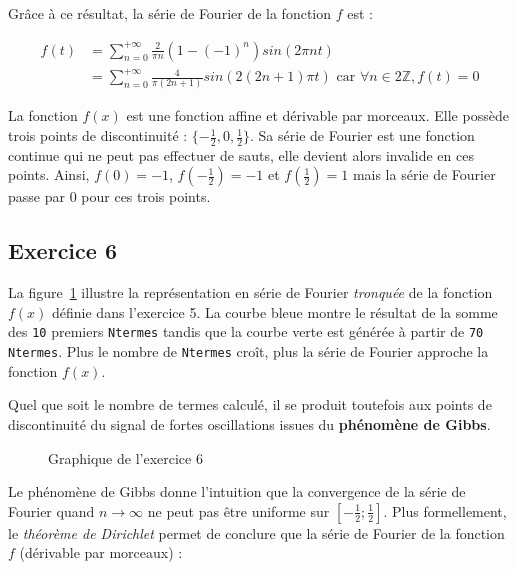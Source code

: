 \documentclass[a4paper,11pt]{article}
\theoremstyle{nonumberplain}
\theoremstyle{nonumberplain}
\theoremstyle{nonumberplain}
\begin{document}
    Grâce à ce résultat, la série de Fourier de la fonction $f$ est :

    \begin{equation*}
        \begin{split}
            f(t)    & = \sum\limits_{n = 0}^{+ \infty}\frac{2}{\pi n}(1 - (-1)^n)sin(2 \pi n t) \\
                    & = \sum\limits_{n = 0}^{+ \infty}\frac{4}{\pi (2n+1)}sin(2 (2n+1) \pi t) \text{ car } \forall n \in 2 \mathbb{Z}, f(t) = 0
        \end{split}
    \end{equation*}

    La fonction $f(x)$ est une fonction affine et dérivable par morceaux. Elle possède trois points de discontinuité : $\{-\frac{1}{2}, 0, \frac{1}{2}\}$.
    Sa série de Fourier est une fonction continue qui ne peut pas effectuer de \og sauts\fg, elle devient alors invalide en ces points.
    Ainsi, $f(0) = -1$, $f(-\frac{1}{2}) = -1$ et $f(\frac{1}{2}) = 1$ mais la série de Fourier passe par $0$ pour ces trois points.


\subsection*{Exercice 6}

    La figure~\ref{graph_exo6} illustre la représentation en série de Fourier \textit{tronquée} de la fonction $f(x)$ définie dans l'exercice 5.
    La courbe bleue montre le résultat de la somme des \texttt{10} premiers \texttt{Ntermes} tandis que la courbe verte est générée à partir de \texttt{70 Ntermes}.
    Plus le nombre de \texttt{Ntermes} croît, plus la série de Fourier approche la fonction $f(x)$.

    Quel que soit le nombre de termes calculé, il se produit toutefois aux points de discontinuité
    du signal de fortes oscillations issues du \textbf{phénomène de Gibbs}.

    \begin{figure}[H]
        \caption{\label{graph_exo6} Graphique de l'exercice 6}
    \end{figure}

    Le phénomène de Gibbs donne l'intuition que la convergence de la série de Fourier quand $n \rightarrow \infty$ ne peut pas être uniforme sur $[-\frac{1}{2}; \frac{1}{2}]$.
    Plus formellement, le \textit{théorème de Dirichlet} permet de conclure que la série de Fourier de la fonction $f$ (dérivable par morceaux) :
\end{document}
